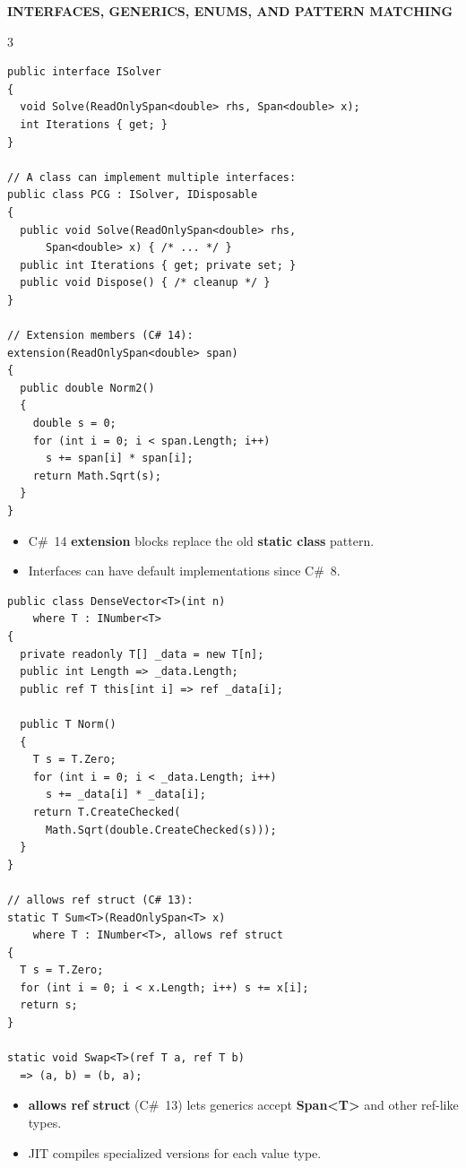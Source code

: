 \documentclass[9pt,a4paper]{extarticle}
\newenvironment{card}[3][acBlue]{%
  \begin{tcolorbox}[
    enhanced, colback=#2, colframe=bdCard,
    coltitle=black, colbacktitle=#2!70!bgHdr,
    fonttitle=\bfseries\fontsize{6.0pt}{7.2pt}\selectfont\MakeUppercase,
    title={#3},
    left=3pt, right=2pt, top=1.2pt, bottom=1.6pt,
    toptitle=1.0pt, bottomtitle=1.0pt,
    boxrule=0.4pt,
    borderline west={3pt}{0pt}{#1},
    arc=2pt, before skip=0pt, after skip=1.6mm,
    breakable,
  ]}{\end{tcolorbox}}
\newcommand{\sectionbanner}[1]{%
  \vspace{0.5mm}%
  {\setlength{\fboxsep}{1.5pt}%
   \colorbox{secBg}{\color{white}\bfseries\fontsize{6.5pt}{7.7pt}\selectfont
   \MakeUppercase{\hspace{0.5mm}#1\hspace{0.5mm}}}%
  }\vspace{1.3mm}\par\nobreak}
\newcommand{\code}[1]{{\ttfamily\bfseries #1}}
\begin{document}
\sectionbanner{Interfaces, Generics, Enums, and Pattern Matching}
\begin{multicols}{3}

\begin{card}[acTeal]{bgTeal}{Interfaces and Extension Members}
\begin{lstlisting}[style=cs]
public interface ISolver
{
  void Solve(ReadOnlySpan<double> rhs, Span<double> x);
  int Iterations { get; }
}

// A class can implement multiple interfaces:
public class PCG : ISolver, IDisposable
{
  public void Solve(ReadOnlySpan<double> rhs,
      Span<double> x) { /* ... */ }
  public int Iterations { get; private set; }
  public void Dispose() { /* cleanup */ }
}

// Extension members (C# 14):
extension(ReadOnlySpan<double> span)
{
  public double Norm2()
  {
    double s = 0;
    for (int i = 0; i < span.Length; i++)
      s += span[i] * span[i];
    return Math.Sqrt(s);
  }
}
\end{lstlisting}
\begin{itemize}
\item C\#~14 \code{extension} blocks replace the old \code{static class} pattern.
\item Interfaces can have default implementations since C\#~8.
\end{itemize}
\end{card}

\begin{card}[acOrange]{bgOrange}{Generics and \code{allows ref struct}}
\begin{lstlisting}[style=cs]
public class DenseVector<T>(int n)
    where T : INumber<T>
{
  private readonly T[] _data = new T[n];
  public int Length => _data.Length;
  public ref T this[int i] => ref _data[i];

  public T Norm()
  {
    T s = T.Zero;
    for (int i = 0; i < _data.Length; i++)
      s += _data[i] * _data[i];
    return T.CreateChecked(
      Math.Sqrt(double.CreateChecked(s)));
  }
}

// allows ref struct (C# 13):
static T Sum<T>(ReadOnlySpan<T> x)
    where T : INumber<T>, allows ref struct
{
  T s = T.Zero;
  for (int i = 0; i < x.Length; i++) s += x[i];
  return s;
}

static void Swap<T>(ref T a, ref T b)
  => (a, b) = (b, a);
\end{lstlisting}
\begin{itemize}
\item \code{allows ref struct} (C\#~13) lets generics accept \code{Span<T>} and other ref-like types.
\item JIT compiles specialized versions for each value type.
\end{itemize}
\end{card}


\end{multicols}
\end{document}
